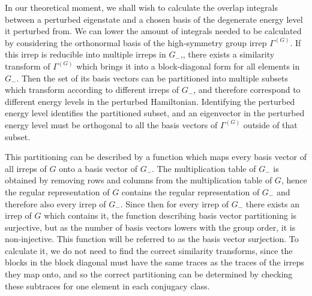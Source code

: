 \documentclass[12pt]{article}
\begin{document}
	In our theoretical moment, we shall wish to calculate the overlap integrals between a perturbed eigenstate and a chosen basis of the degenerate energy level it perturbed from. We can lower the amount of integrals needed to be calculated by considering the orthonormal basis of the high-symmetry group irrep $\Gamma^{(G)}$. If this irrep is reducible into multiple irreps in $G_-$,, there exists a similarity transform of $\Gamma^{(G)}$ which brings it into a block-diagonal form for all elements in $G_-$. Then the set of its basis vectors can be partitioned into multiple subsets which transform according to different irreps of $G_-$, and therefore correspond to different energy levels in the perturbed Hamiltonian. Identifying the perturbed energy level identifies the partitioned subset, and an eigenvector in the perturbed energy level must be orthogonal to all the basis vectors of $\Gamma^{(G)}$ outside of that subset.
	
	This partitioning can be described by a function which maps every basis vector of all irreps of $G$ onto a basis vector of $G_-$. The multiplication table of $G_-$ is obtained by removing rows and columns from the multiplication table of $G$, hence the regular representation of $G$ contains the regular representation of $G_-$ and therefore also every irrep of $G_-$. Since then for every irrep of $G_-$ there exists an irrep of $G$ which contains it, the function describing basis vector partitioning is surjective, but as the number of basis vectors lowers with the group order, it is non-injective. This function will be referred to as the basis vector surjection. To calculate it, we do not need to find the correct similarity transforms, since the blocks in the block diagonal must have the same traces as the traces of the irreps they map onto, and so the correct partitioning can be determined by checking these subtraces for one element in each conjugacy class.
	
\end{document}

